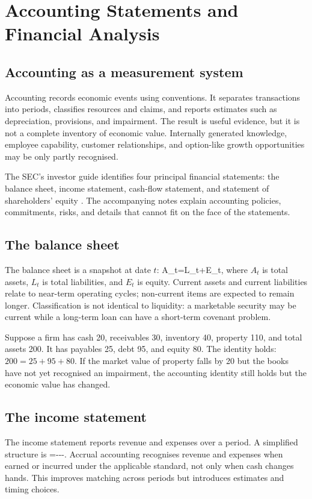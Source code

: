 \chapter{Accounting Statements and Financial Analysis}

\section{Accounting as a measurement system}
Accounting records economic events using conventions. It separates transactions into periods, classifies resources and claims, and reports estimates such as depreciation, provisions, and impairment. The result is useful evidence, but it is not a complete inventory of economic value. Internally generated knowledge, employee capability, customer relationships, and option-like growth opportunities may be only partly recognised.

The SEC's investor guide identifies four principal financial statements: the balance sheet, income statement, cash-flow statement, and statement of shareholders' equity \cite{secfinancialstatements}. The accompanying notes explain accounting policies, commitments, risks, and details that cannot fit on the face of the statements.

\section{The balance sheet}
The balance sheet is a snapshot at date $t$:
  A_t=L_t+E_t,
\closeformula
where $A_t$ is total assets, $L_t$ is total liabilities, and $E_t$ is equity. Current assets and current liabilities relate to near-term operating cycles; non-current items are expected to remain longer. Classification is not identical to liquidity: a marketable security may be current while a long-term loan can have a short-term covenant problem.

\begin{worked}
Suppose a firm has cash 20, receivables 30, inventory 40, property 110, and total assets 200. It has payables 25, debt 95, and equity 80. The identity holds: $200=25+95+80$. If the market value of property falls by 20 but the books have not yet recognised an impairment, the accounting identity still holds but the economic value has changed.
\end{worked}

\section{The income statement}
The income statement reports revenue and expenses over a period. A simplified structure is
  =---.
\closeformula
Accrual accounting recognises revenue and expenses when earned or incurred under the applicable standard, not only when cash changes hands. This improves matching across periods but introduces estimates and timing choices.

